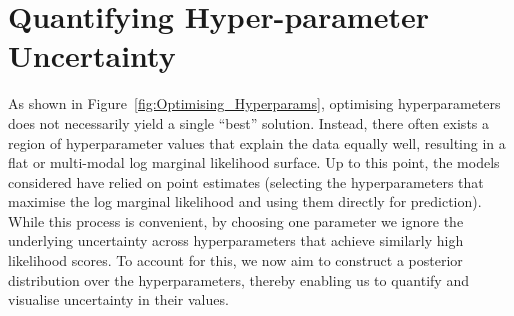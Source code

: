 \documentclass{ucdgradtaughtthesis}
\begin{document}
\section{Quantifying Hyper-parameter Uncertainty}
\label{sec: MCMC}
As shown in Figure~\ref{fig:Optimising_Hyperparams}, optimising hyperparameters does not necessarily yield a single “best” solution. 
Instead, there often exists a region of hyperparameter values that explain the data equally well, resulting in a flat or multi-modal log marginal likelihood surface.
Up to this point, the models considered have relied on point estimates (selecting the hyperparameters that maximise the log marginal likelihood and using them directly for prediction). 
While this process is convenient, by choosing one parameter we ignore the underlying uncertainty across hyperparameters that achieve similarly high likelihood scores. 
To account for this, we now aim to construct a posterior distribution over the hyperparameters, thereby enabling us to quantify and visualise uncertainty in their values.
%
\end{document}
